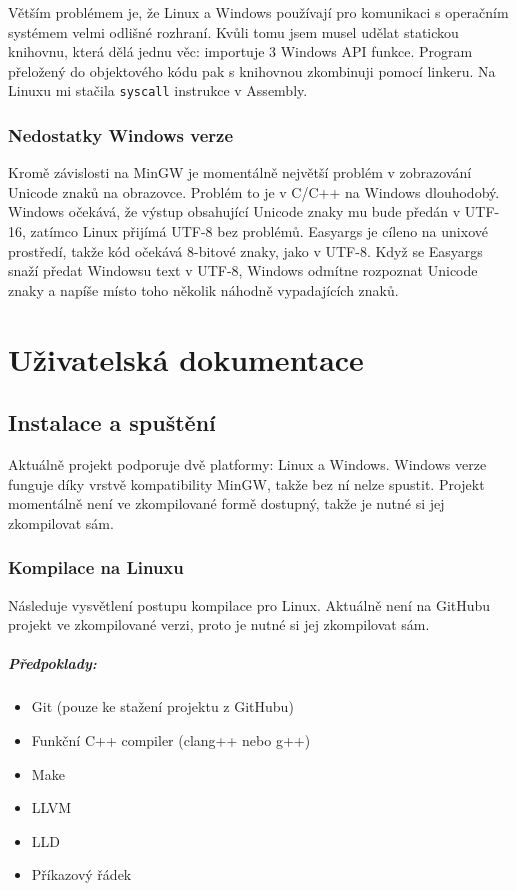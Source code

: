 \documentclass[12pt, a4paper, titlepage, abstract=on]{scrreprt}
\begin{document}
Větším problémem je, že Linux a Windows používají pro komunikaci s operačním systémem velmi odlišné rozhraní. Kvůli tomu jsem musel udělat
statickou knihovnu, která dělá jednu věc: importuje 3 Windows API funkce. Program přeložený do objektového kódu pak s knihovnou zkombinuji
pomocí linkeru. Na Linuxu mi stačila \texttt{syscall} instrukce v Assembly.

\subsection{Nedostatky Windows verze}
Kromě závislosti na MinGW je momentálně největší problém v zobrazování Unicode znaků na obrazovce. Problém to je v C/C++ na Windows dlouhodobý.
Windows očekává, že výstup obsahující Unicode znaky mu bude předán v UTF-16, zatímco Linux přijímá UTF-8 bez problémů. Easyargs je cíleno na unixové
prostředí, takže kód očekává 8-bitové znaky, jako v UTF-8. Když se Easyargs snaží předat Windowsu text v UTF-8, Windows odmítne rozpoznat Unicode
znaky a napíše místo toho několik náhodně vypadajících znaků.

\chapter{Uživatelská dokumentace}
\section{Instalace a spuštění}
Aktuálně projekt podporuje dvě platformy: Linux a Windows. Windows verze funguje díky vrstvě kompatibility MinGW, takže bez ní nelze spustit.
Projekt momentálně není ve zkompilované formě dostupný, takže je nutné si jej zkompilovat sám.

\subsection{Kompilace na Linuxu}
Následuje vysvětlení postupu kompilace pro Linux. Aktuálně není na GitHubu projekt ve zkompilované verzi, proto je nutné si jej zkompilovat sám.

\paragraph{Předpoklady:}
\begin{itemize}
 \item Git (pouze ke stažení projektu z GitHubu)
 \item Funkční C++ compiler (clang++ nebo g++)
 \item Make
 \item LLVM
 \item LLD
 \item Příkazový řádek
\end{itemize}
\end{document}
